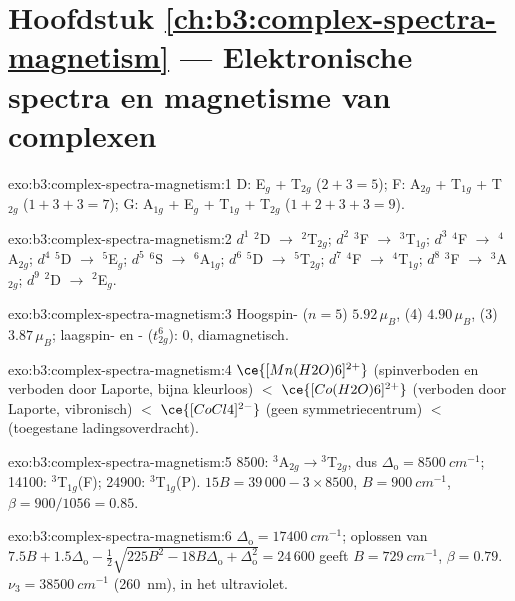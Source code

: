 \section*{Hoofdstuk \ref{ch:b3:complex-spectra-magnetism} --- Elektronische spectra en magnetisme van complexen}

\begin{solution}{exo:b3:complex-spectra-magnetism:1}
D: E$_g$ + T$_{2g}$ ($2 + 3 = 5$); F: A$_{2g}$ + T$_{1g}$ + T$_{2g}$ ($1 + 3 + 3 = 7$); G: A$_{1g}$ + E$_g$ + T$_{1g}$ + T$_{2g}$
($1 + 2 + 3 + 3 = 9$).
\end{solution}

\begin{solution}{exo:b3:complex-spectra-magnetism:2}
$d^1$ $^2$D $\to$ $^2$T$_{2g}$; $d^2$ $^3$F $\to$ $^3$T$_{1g}$; $d^3$ $^4$F $\to$ $^4$A$_{2g}$; $d^4$ $^5$D $\to$ $^5$E$_g$; $d^5$ $^6$S $\to$ $^6$A$_{1g}$; $d^6$ $^5$D
$\to$ $^5$T$_{2g}$; $d^7$ $^4$F $\to$ $^4$T$_{1g}$; $d^8$ $^3$F $\to$ $^3$A$_{2g}$; $d^9$ $^2$D $\to$ $^2$E$_g$.
\end{solution}

\begin{solution}{exo:b3:complex-spectra-magnetism:3}
Hoogspin- ($n = 5$) $5.92\,\mu_B$,  (4) $4.90\,\mu_B$,  (3) $3.87\,\mu_B$; laagspin- en
- ($t_{2g}^6$): 0, diamagnetisch.
\end{solution}

\begin{solution}{exo:b3:complex-spectra-magnetism:4}
$\ce{[Mn(H2O)6]^{2+}}$ (spinverboden en verboden door Laporte, bijna kleurloos) $<$ $\ce{[Co(H2O)6]^{2+}}$
(verboden door Laporte, vibronisch) $<$ $\ce{[CoCl4]^{2-}}$ (geen symmetriecentrum) $<$  (toegestane
ladingsoverdracht).
\end{solution}

\begin{solution}{exo:b3:complex-spectra-magnetism:5}
8500: $^3$A$_{2g}\to{}^3$T$_{2g}$, dus $\Delta_{\mathrm o} = \qty{8500}{cm^{-1}}$; 14100: $^3$T$_{1g}$(F); 24900: $^3$T$_{1g}$(P).
$15B = 39\,000 - 3 \times 8500$, $B = \qty{900}{cm^{-1}}$, $\beta = 900/1056 = 0.85$.
\end{solution}

\begin{solution}{exo:b3:complex-spectra-magnetism:6}
$\Delta_{\mathrm o} = \qty{17400}{cm^{-1}}$; oplossen van $7.5B + 1.5\Delta_{\mathrm o} - \frac12\sqrt{225B^2 - 18B\Delta_{\mathrm o} + \Delta_{\mathrm o}^2} = 24\,600$ geeft $B = \qty{729}{cm^{-1}}$,
$\beta = 0.79$. $\nu_3 = \qty{38500}{cm^{-1}}$ (\qty{260}{nm}), in het ultraviolet.
\end{solution}

